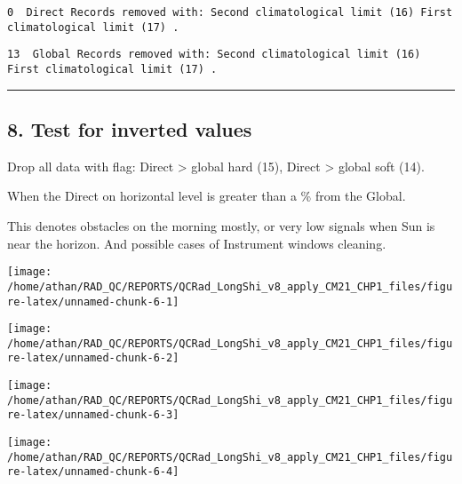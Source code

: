\documentclass[
  10pt,
  a4paper,oneside]{article}
\begin{document}
\begin{verbatim}
0  Direct Records removed with: Second climatological limit (16) First climatological limit (17) .
\end{verbatim}

\begin{verbatim}
13  Global Records removed with: Second climatological limit (16) First climatological limit (17) .
\end{verbatim}

\begin{center}\rule{0.5\linewidth}{0.5pt}\end{center}

\newpage

\hypertarget{test-for-inverted-values}{%
\subsection{8. Test for inverted values}\label{test-for-inverted-values}}

Drop all data with flag: Direct \textgreater{} global hard (15), Direct \textgreater{} global soft (14).

When the Direct on horizontal level is greater than a \%
from the Global.

This denotes obstacles on the morning mostly, or very low
signals when Sun is near the horizon. And possible
cases of Instrument windows cleaning.

\begin{center}\texttt{[image: /home/athan/RAD\_QC/REPORTS/QCRad\_LongShi\_v8\_apply\_CM21\_CHP1\_files/figure-latex/unnamed-chunk-6-1]} \end{center}

\begin{center}\texttt{[image: /home/athan/RAD\_QC/REPORTS/QCRad\_LongShi\_v8\_apply\_CM21\_CHP1\_files/figure-latex/unnamed-chunk-6-2]} \end{center}

\begin{center}\texttt{[image: /home/athan/RAD\_QC/REPORTS/QCRad\_LongShi\_v8\_apply\_CM21\_CHP1\_files/figure-latex/unnamed-chunk-6-3]} \end{center}

\begin{center}\texttt{[image: /home/athan/RAD\_QC/REPORTS/QCRad\_LongShi\_v8\_apply\_CM21\_CHP1\_files/figure-latex/unnamed-chunk-6-4]} \end{center}
\end{document}
